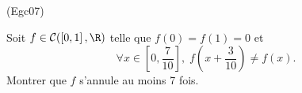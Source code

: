 \begin{tiny}(Egc07)\end{tiny}
Soit $f \in \mathcal{C}(\left[ 0,1\right],\R)$ telle que $f(0)=f(1)=0$ et
\[
 \forall x \in \left[ 0, \frac{7}{10}\right],\;f(x+\frac{3}{10}) \neq f(x). 
\]
Montrer que $f$ s'annule au moins 7 fois.